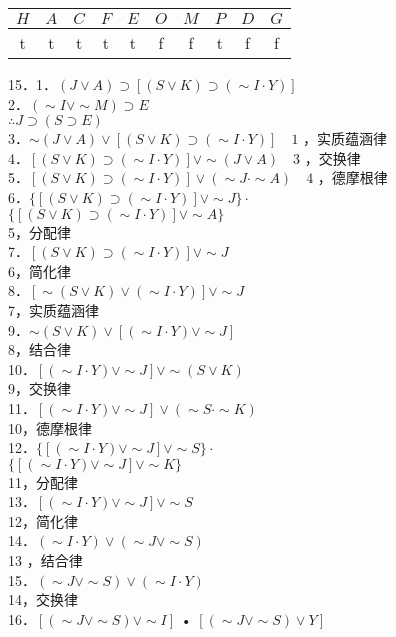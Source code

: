 \begin{center}
\begin{tabular}{cccccccccc}
$H$ & $A$ & $C$ & $F$ & $E$ & $O$ & $M$ & $P$ & $D$ & $G$ \\
\hline
t & t & t & t & t & f & f & t & f & f \\
\hline
\end{tabular}
\end{center}

15．1．$(J \vee A) \supset[(S \vee K) \supset(\sim I \cdot Y)]$\\
2．$(\sim I \vee \sim M) \supset E$\\
$\therefore J \supset(S \supset E)$\\
3．$\sim(J \vee A) \vee[(S \vee K) \supset(\sim I \cdot Y)] \quad 1$ ，实质蕴涵律\\
4．$[(S \vee K) \supset(\sim I \cdot Y)] \vee \sim(J \vee A) \quad 3$ ，交换律\\
5．$[(S \vee K) \supset(\sim I \cdot Y)] \vee(\sim J \cdot \sim A) \quad 4$ ，德摩根律\\
6．$\{[(S \vee K) \supset(\sim I \cdot Y)] \vee \sim J\} \cdot$\\
$\{[(S \vee K) \supset(\sim I \cdot Y)] \vee \sim A\}$\\
5，分配律\\
7．$[(S \vee K) \supset(\sim I \cdot Y)] \vee \sim J$\\
6，简化律\\
8．$[\sim(S \vee K) \vee(\sim I \cdot Y)] \vee \sim J$\\
7，实质蕴涵律\\
9．$\sim(S \vee K) \vee[(\sim I \cdot Y) \vee \sim J]$\\
8，结合律\\
10．$[(\sim I \cdot Y) \vee \sim J] \vee \sim(S \vee K)$\\
9，交换律\\
11．$[(\sim I \cdot Y) \vee \sim J] \vee(\sim S \cdot \sim K)$\\
10，德摩根律\\
12．$\{[(\sim I \cdot Y) \vee \sim J] \vee \sim S\} \cdot$\\
$\{[(\sim I \cdot Y) \vee \sim J] \vee \sim K\}$\\
11，分配律\\
13．$[(\sim I \cdot Y) \vee \sim J] \vee \sim S$\\
12，简化律\\
14．$(\sim I \cdot Y) \vee(\sim J \vee \sim S)$\\
13 ，结合律\\
15．$(\sim J \vee \sim S) \vee(\sim I \cdot Y)$\\
14，交换律\\
16．$[(\sim J \vee \sim S) \vee \sim I]$ • $[(\sim J \vee \sim S) \vee Y]$

